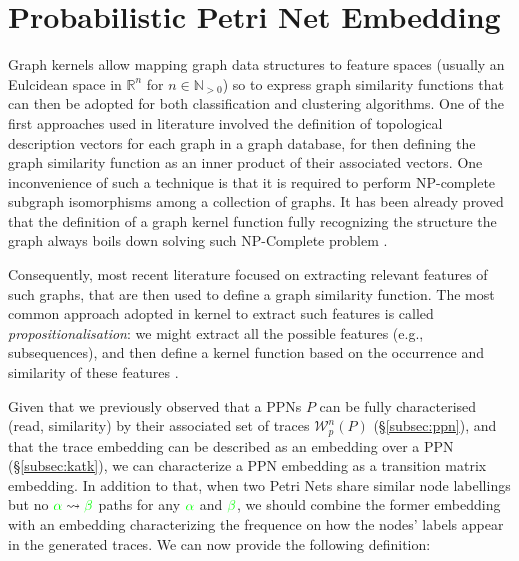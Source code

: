 \section{Probabilistic Petri Net Embedding}
Graph kernels allow mapping graph data structures to feature spaces (usually an Eulcidean space in $\mathbb{R}^n$ for $n\in \mathbb{N}_{>0}$) \cite{Samatova} so to express graph similarity functions that can then be adopted for both classification \cite{TsudaS10} and clustering \cite{Raedt} algorithms. One of the first approaches used in literature involved the definition of topological description vectors \cite{Sidere} for each graph in a graph database, for then defining the graph similarity function as an inner product of their associated vectors. One inconvenience of such a technique is that it is required to perform  NP-complete subgraph isomorphisms among a collection of graphs. It has been already proved that the definition of a graph kernel function fully recognizing the structure the graph always boils down solving such  NP-Complete problem \cite{GartnerFW03}. 


Consequently, most recent literature focused on extracting relevant features of such graphs, that are then used to define a graph similarity function. The most common approach adopted in kernel to extract such features is called \textit{propositionalisation}: we might extract all the possible features (e.g., subsequences), and then define a kernel function based on the occurrence and similarity of these features \cite{Gartner03}. 

Given that we previously observed that a PPNs $P$ can be fully characterised (read, similarity) by their associated set of traces $\mathcal{W}_p^n(P)$ (\S\ref{subsec:ppn}), and that the trace embedding can be described as an embedding over a PPN (\S\ref{subsec:katk}), we can characterize a PPN embedding as a transition matrix embedding. In addition to that, when two Petri Nets share similar node labellings but no ${\color{green}\alpha}\rightsquigarrow{\color{green}\beta}$ paths for any ${\color{green}\alpha}$ and ${\color{green}\beta}$, we should combine the former embedding with an embedding characterizing the frequence on how the nodes' labels appear in the generated traces. We can now provide the following definition:

